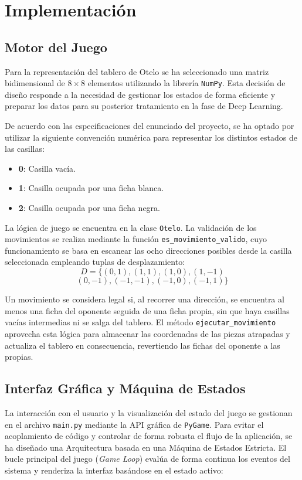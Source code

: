 \documentclass[conference]{IEEEtran}
\begin{document}
\section{Implementación}

\subsection{Motor del Juego}
Para la representación del tablero de Otelo se ha seleccionado una matriz bidimensional de $8 \times 8$ elementos utilizando la librería \texttt{NumPy}.
Esta decisión de diseño responde a la necesidad de gestionar los estados de forma eficiente y preparar los datos para su posterior tratamiento en la fase de Deep Learning.

De acuerdo con las especificaciones del enunciado del proyecto, se ha optado por utilizar la siguiente convención numérica para representar los distintos estados de las casillas:
\begin{itemize}
    \item \textbf{0}: Casilla vacía.
    \item \textbf{1}: Casilla ocupada por una ficha blanca.
    \item \textbf{2}: Casilla ocupada por una ficha negra.
\end{itemize}

La lógica de juego se encuentra en la clase \texttt{Otelo}. La validación de los movimientos se realiza mediante la función \texttt{es\_movimiento\_valido}, 
cuyo funcionamiento se basa en escanear las ocho direcciones posibles desde la casilla seleccionada empleando tuplas de desplazamiento:
\[
D = \{(0,1), (1,1), (1,0), (1,-1)
\]
\[
(0,-1), (-1,-1), (-1,0), (-1,1)\}
\]

Un movimiento se considera legal si, al recorrer una dirección, se encuentra al menos una ficha del oponente seguida de una ficha propia, sin que haya casillas vacías intermedias ni se 
salga del tablero. El método \texttt{ejecutar\_movimiento} aprovecha esta lógica para almacenar las coordenadas de las piezas atrapadas y actualiza el tablero en consecuencia, revertiendo las fichas del oponente a las propias.

\subsection{Interfaz Gráfica y Máquina de Estados}
La interacción con el usuario y la visualización del estado del juego se gestionan en el archivo \texttt{main.py} mediante la API gráfica de \texttt{PyGame}. 
Para evitar el acoplamiento de código y controlar de forma robusta el flujo de la aplicación, se ha diseñado una Arquitectura basada en una Máquina de Estados 
Estricta. El bucle principal del juego (\textit{Game Loop}) evalúa de forma continua los eventos del sistema y renderiza la interfaz basándose en el estado activo:
\end{document}
